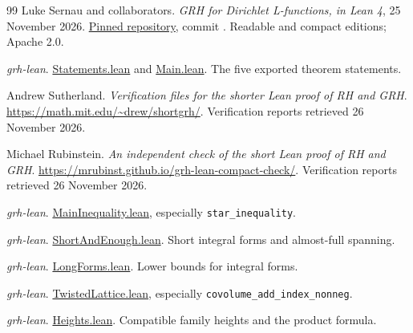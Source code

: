 \begin{thebibliography}{99}
\small
{}
Luke Sernau and collaborators.
\emph{GRH for Dirichlet L-functions, in Lean 4}, 25 November 2026.
\href{https://github.com/lsernau/grh-lean/tree/72fead102f663d5c7a407964a13dc0cf9d977207}{Pinned repository},
commit \upcommit. Readable and compact editions; Apache 2.0.

\emph{grh-lean}.
\href{https://github.com/lsernau/grh-lean/blob/72fead102f663d5c7a407964a13dc0cf9d977207/grh/src/Statements.lean}{Statements.lean}
and
\href{https://github.com/lsernau/grh-lean/blob/72fead102f663d5c7a407964a13dc0cf9d977207/grh/src/Main.lean}{Main.lean}.
The five exported theorem statements.

Andrew Sutherland.
\emph{Verification files for the shorter Lean proof of RH and GRH}.
\url{https://math.mit.edu/~drew/shortgrh/}.
Verification reports retrieved 26 November 2026.

Michael Rubinstein.
\emph{An independent check of the short Lean proof of RH and GRH}.
\url{https://mrubinst.github.io/grh-lean-compact-check/}.
Verification reports retrieved 26 November 2026.

\emph{grh-lean}.
\href{https://github.com/lsernau/grh-lean/blob/72fead102f663d5c7a407964a13dc0cf9d977207/grh/src/New/Reduction/MainInequality.lean}{MainInequality.lean},
especially \texttt{star\_inequality}.

\emph{grh-lean}.
\href{https://github.com/lsernau/grh-lean/blob/72fead102f663d5c7a407964a13dc0cf9d977207/grh/src/New/Reduction/ShortAndEnough.lean}{ShortAndEnough.lean}.
Short integral forms and almost-full spanning.

\emph{grh-lean}.
\href{https://github.com/lsernau/grh-lean/blob/72fead102f663d5c7a407964a13dc0cf9d977207/grh/src/New/Determinant/Twist/LongForms.lean}{LongForms.lean}.
Lower bounds for integral forms.

\emph{grh-lean}.
\href{https://github.com/lsernau/grh-lean/blob/72fead102f663d5c7a407964a13dc0cf9d977207/grh/src/New/Reduction/Lattices/TwistedLattice.lean}{TwistedLattice.lean},
especially \texttt{covolume\_add\_index\_nonneg}.

\emph{grh-lean}.
\href{https://github.com/lsernau/grh-lean/blob/72fead102f663d5c7a407964a13dc0cf9d977207/grh/src/New/Reduction/Lattices/Heights.lean}{Heights.lean}.
Compatible family heights and the product formula.


\end{thebibliography}
